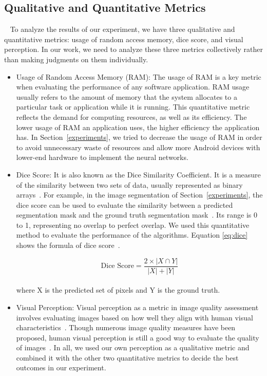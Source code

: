 \documentclass[runningheads]{llncs}
\begin{document}
\subsection{Qualitative and Quantitative Metrics}~\label{metrics}
To analyze the results of our experiment, we have three qualitative and quantitative metrics: usage of random access memory, dice score, and visual perception. In our work, we need to analyze these three metrics collectively rather than making judgments on them individually.
\begin{itemize}
	\item Usage of Random Access Memory (RAM): The usage of RAM is a key metric when evaluating the performance of any software application. RAM usage usually refers to the amount of memory that the system allocates to a particular task or application while it is running. This quantitative metric reflects the demand for computing resources, as well as its efficiency. The lower usage of RAM an application uses, the higher efficiency the application has. In Section~\ref{experiments}, we tried to decrease the usage of RAM in order to avoid unnecessary waste of resources and allow more Android devices with lower-end hardware to implement the neural networks.
	\item Dice Score: It is also known as the Dice Similarity Coefficient. It is a measure of the similarity between two sets of data, usually represented as binary arrays~\cite{dicescore2023}. For example, in the image segmentation of Section~\ref{experiments}, the dice score can be used to evaluate the similarity between a predicted segmentation mask and the ground truth segmentation mask~\cite{dicescore2023}. Its range is 0 to 1, representing no overlap to perfect overlap. We used this quantitative method to evaluate the performance of the algorithms. Equation \eqref{eq:dice} shows the formula of dice score~\cite{yerram2020dice}.
	
	\begin{equation}\label{eq:dice}
		\text{Dice Score} = \frac{2 \times |X \cap Y|}{|X| + |Y|}
	\end{equation}
\\where X is the predicted set of pixels and Y is the ground truth.\\
		\item Visual Perception: Visual perception as a metric in image quality assessment involves evaluating images based on how well they align with human visual characteristics~\cite{fu2016visual}. Though numerous image quality measures have been proposed, human visual perception is still a good way to evaluate the quality of images~\cite{wajid2014visual}. In all, we used our own perception as a qualitative metric and combined it with the other two quantitative metrics to decide the best outcomes in our experiment. 
\end{itemize}	
\end{document}
